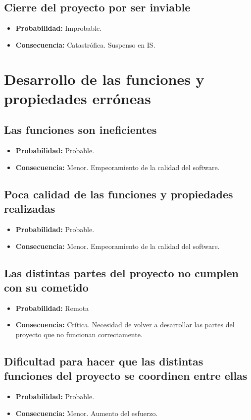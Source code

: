 \documentclass[spanish,a4paper,12pt]{report}	%
\begin{document}
\subsection*{Cierre del proyecto por ser inviable}
	\begin{itemize}
		\item \textbf {Probabilidad: }Improbable.
		\item \textbf {Consecuencia: }Catastrófica. Suspenso en IS.
	\end{itemize}

%
\section{Desarrollo de las funciones y propiedades erróneas}

\subsection*{Las funciones son ineficientes}
	\begin{itemize}
		\item \textbf {Probabilidad: }Probable.
		\item \textbf {Consecuencia: }Menor. Empeoramiento de la calidad del software.
	\end{itemize}

\subsection*{Poca calidad de las funciones y propiedades realizadas}
	\begin{itemize}
		\item \textbf {Probabilidad: }Probable.
		\item \textbf {Consecuencia: }Menor. Empeoramiento de la calidad del software.
	\end{itemize}

\subsection*{Las distintas partes del proyecto no cumplen con su cometido}
	\begin{itemize}
		\item \textbf {Probabilidad: }Remota
		\item \textbf {Consecuencia: }Crítica. Necesidad de volver a desarrollar las partes del proyecto que no funcionan correctamente.
	\end{itemize}

\subsection*{Dificultad para hacer que las distintas funciones del proyecto se coordinen entre ellas}
	\begin{itemize}
		\item \textbf {Probabilidad: }Probable.
		\item \textbf {Consecuencia: }Menor. Aumento del esfuerzo.
	\end{itemize}
\end{document}
